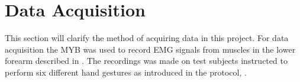 \section{Data Acquisition} \label{sec:M:dataAcquisition}

This section will clarify the method of acquiring data in this project. For data acquisition the MYB was used to record EMG signals from muscles in the lower forearm described in . The recordings was made on test subjects instructed to perform six different hand gestures as introduced in the protocol, . 



